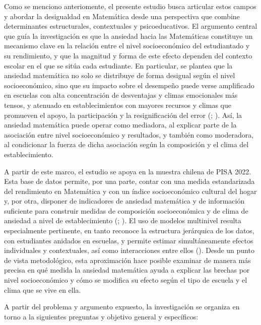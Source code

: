 \documentclass[
  spanish,
  a4paper,
  oneside]{scrbook}
\begin{document}
Como se menciono anteriomente, el presente estudio busca articular estos
campos y abordar la desigualdad en Matemática desde una perspectiva que
combine determinantes estructurales, contextuales y psicoeducativos. El
argumento central que guía la investigación es que la ansiedad hacia las
Matemáticas constituye un mecanismo clave en la relación entre el nivel
socioeconómico del estudiantado y su rendimiento, y que la magnitud y
forma de este efecto dependen del contexto escolar en el que se sitúa
cada estudiante. En particular, se plantea que la ansiedad matemática no
solo se distribuye de forma desigual según el nivel socioeconómico, sino
que su impacto sobre el desempeño puede verse amplificado en escuelas
con alta concentración de desventajas y climas emocionales más tensos, y
atenuado en establecimientos con mayores recursos y climas que promueven
el apoyo, la participación y la resignificación del error
(;
). Así, la ansiedad
matemática puede operar como mediadora, al explicar parte de la
asociación entre nivel socioeconómico y resultados, y también como
moderadora, al condicionar la fuerza de dicha asociación según la
composición y el clima del establecimiento.

A partir de este marco, el estudio se apoya en la muestra chilena de
PISA 2022. Esta base de datos permite, por una parte, contar con una
medida estandarizada del rendimiento en Matemática y con un índice
socioeconómico cultural del hogar y, por otra, disponer de indicadores
de ansiedad matemática y de información suficiente para construir
medidas de composición socioeconómica y de clima de ansiedad a nivel de
establecimiento (;
). El uso de modelos multinivel
resulta especialmente pertinente, en tanto reconoce la estructura
jerárquica de los datos, con estudiantes anidados en escuelas, y permite
estimar simultáneamente efectos individuales y contextuales, así como
interacciones entre ellos (). Desde un punto de vista metodológico, esta aproximación hace
posible examinar de manera más precisa en qué medida la ansiedad
matemática ayuda a explicar las brechas por nivel socioeconómico y cómo
se modifica su efecto según el tipo de escuela y el clima que se vive en
ella.

A partir del problema y argumento expuesto, la investigación se organiza
en torno a la siguientes preguntas y objetivo general y específicos:
\end{document}
